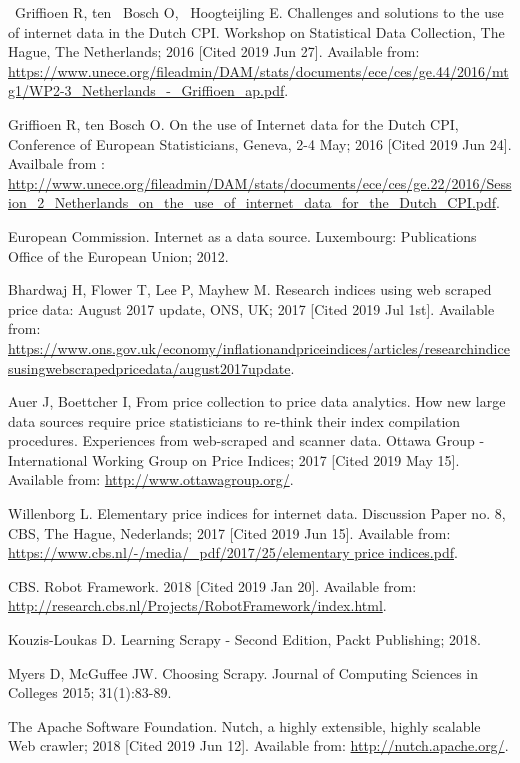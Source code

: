 \documentclass[]{article}
\begin{document}
\begin{thebibliography}{99}
~Griffioen R, ten ~Bosch O, ~Hoogteijling E. Challenges and solutions to the use of internet data in the Dutch CPI. 
Workshop on Statistical Data Collection, The Hague, The Netherlands; 2016 [Cited 2019 Jun 27]. Available from: \url{https://www.unece.org/fileadmin/DAM/stats/documents/ece/ces/ge.44/2016/mtg1/WP2-3_Netherlands_-_Griffioen_ap.pdf}.

Griffioen R, ten Bosch O. On the use of Internet data for the Dutch CPI,
Conference of European Statisticians, Geneva, 2-4 May; 2016 [Cited 2019 Jun 24]. Availbale from : \url{http://www.unece.org/fileadmin/DAM/stats/documents/ece/ces/ge.22/2016/Session_2_Netherlands_on_the_use_of_internet_data_for_the_Dutch_CPI.pdf}.

European Commission. Internet as a data source. Luxembourg: Publications Office of the European Union; 2012.

Bhardwaj H, Flower T, Lee P, Mayhew M. Research indices using web scraped price data: August 2017 update, ONS, UK; 2017 [Cited 2019 Jul 1st]. Available from:
\url{https://www.ons.gov.uk/economy/inflationandpriceindices/articles/researchindicesusingwebscrapedpricedata/august2017update}.

Auer J, Boettcher I, From price collection to price data analytics. How new large data sources require price statisticians to re-think their index compilation procedures. Experiences from web-scraped and scanner data.
Ottawa Group - International Working Group on Price Indices; 2017 [Cited 2019 May 15]. Available from: \url{http://www.ottawagroup.org/}.

Willenborg L. Elementary price indices for internet data. Discussion Paper no. 8, CBS, The Hague, Nederlands; 2017 [Cited 2019 Jun 15]. Available from:
\url{https://www.cbs.nl/-/media/_pdf/2017/25/elementary price indices.pdf}.

CBS. Robot Framework. 2018 [Cited 2019 Jan 20]. Available from: \url{http://research.cbs.nl/Projects/RobotFramework/index.html}.

Kouzis-Loukas D. Learning Scrapy - Second Edition, Packt Publishing; 2018.

Myers D, McGuffee JW. Choosing Scrapy. Journal of Computing Sciences in Colleges 2015; 31(1):83-89.

The Apache Software Foundation. Nutch, a highly extensible, highly scalable Web crawler; 2018 [Cited 2019 Jun 12]. Available from:
\url{http://nutch.apache.org/}.


\end{thebibliography}
\end{document}
